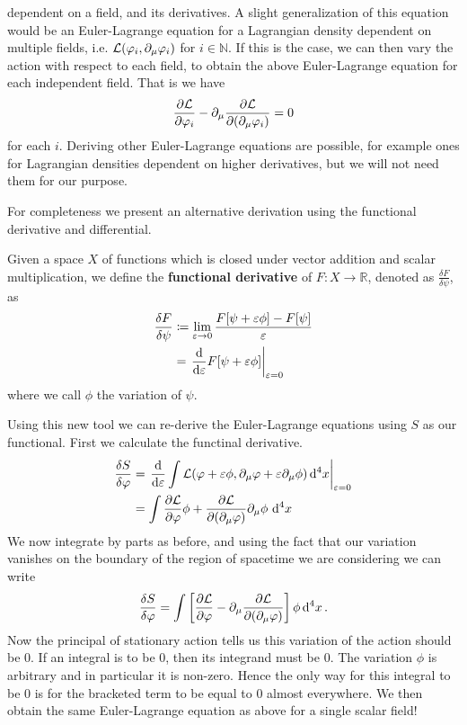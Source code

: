 dependent on a field, and its derivatives. A slight generalization of this
equation would be an Euler-Lagrange equation for a Lagrangian density dependent
on multiple fields, i.e. \(\mathcal{L}(\varphi_i,\partial_\mu\varphi_i)\) for
\(i\in\mathbb{N}\). If this is the case, we can then vary the action with
respect to each field, to obtain the above Euler-Lagrange equation for each
independent field. That is we have 
\begin{equation}\label{eq:ELfieldsMul}
    \pdv{\mathcal{L}}{\varphi_i} - \partial_\mu \pdv{\mathcal{L}}{(\partial_\mu\varphi_i)} = 0
\end{equation}
for each \(i\). Deriving other Euler-Lagrange equations are possible, for
example ones for Lagrangian densities dependent on higher derivatives, but we
will not need them for our purpose.

For completeness we present an alternative derivation using the functional
derivative and differential.
\begin{definition}\label{funcD}
    Given a space \(X\) of functions which is closed under vector addition and
    scalar multiplication, we define the \textbf{functional derivative} of
    \(F:X\to \mathbb{R}\), denoted as \(\frac{\delta F}{\delta \psi}\), as
    \begin{align}
        \frac{\delta F}{\delta \psi} & \coloneqq \lim_{\varepsilon\to 0}\frac{F[\psi + \varepsilon\phi] - F[\psi]}{\varepsilon} \nonumber \\
                                     & = \left.\dv{\varepsilon} F[\psi + \varepsilon\phi]\right|_{\varepsilon = 0}
    \end{align}
    where we call \(\phi\) the variation of \(\psi\).
\end{definition}


Using this new tool we can re-derive the Euler-Lagrange equations using \(S\) as
our functional. First we calculate the functinal derivative.
\begin{align*}
    \fdv{S}{\varphi} & = \left.\dv{\varepsilon}\int\lag(\varphi + \varepsilon\phi, \partial_\mu\varphi + \varepsilon\partial_\mu\phi)\dd[4]{x}\right|_{\varepsilon = 0} \\
                     & = \int \pdv{\lag}{\varphi}\phi + \pdv{\lag}{(\partial_\mu\varphi)}\partial_\mu\phi\,\dd[4]{x}
\end{align*}
We now integrate by parts as before, and using the fact that our variation
vanishes on the boundary of the region of spacetime we are considering we can
write
\begin{equation}
    \fdv{S}{\varphi} = \int \left[\pdv{\lag}{\varphi} - \partial_\mu \pdv{\lag}{(\partial_\mu\varphi)}\right]\phi\dd[4]{x}.
\end{equation}
Now the principal of stationary action tells us this variation of the action
should be 0. If an integral is to be 0, then its integrand must be 0. The
variation \(\phi\) is arbitrary and in particular it is non-zero. Hence the only
way for this integral to be 0 is for the bracketed term to be equal to 0 almost
everywhere. We then obtain the same Euler-Lagrange equation as above for a
single scalar field!

